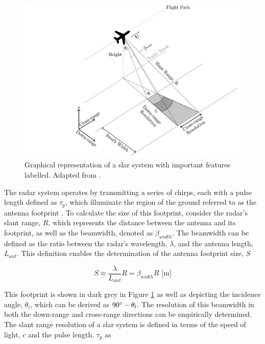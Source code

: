 \begin{figure}[H]
    \centering
    \includegraphics[width=.95\linewidth]{Figures/Theory/slarGeometry.pdf}
    \caption{Graphical representation of a \acs{slar} system with important features labelled. Adapted from \cite{Moreira2013,Meyer2019}.}
    \label{fig:theory.slarGeometry}
\end{figure}

The radar system operates by transmitting a series of chirps, each with a pulse length defined as $\tau_{p}$, which illuminate the region of the ground referred to as the antenna footprint \cite{Meyer2019}. To calculate the size of this footprint, consider the radar's slant range, $R$, which represents the distance between the antenna and its footprint, as well as the beamwidth, denoted as $\beta_{width}$. The beamwidth can be defined as the ratio between the radar's wavelength, $\lambda$, and the antenna length, $L_{ant}$. This definition enables the determination of the antenna footprint size, $S$ \cite{Meyer2019}

\begin{equation} \label{eq:rar.footprintSize}
    S \approx \frac{\lambda}{L_{ant}}R = \beta_{width} R \,\, \text{[m]}
\end{equation}

This footprint is shown in dark grey in Figure \ref{fig:theory.slarGeometry} as well as depicting the incidence angle, $\theta_{i}$, which can be derived as $90 \degree - \theta_{l}$. The resolution of this beamwidth in both the down-range and cross-range directions can be empirically determined. The slant range resolution of a \ac{slar} system is defined in terms of the speed of light, $c$ and the pulse length, $\tau_{p}$ as

